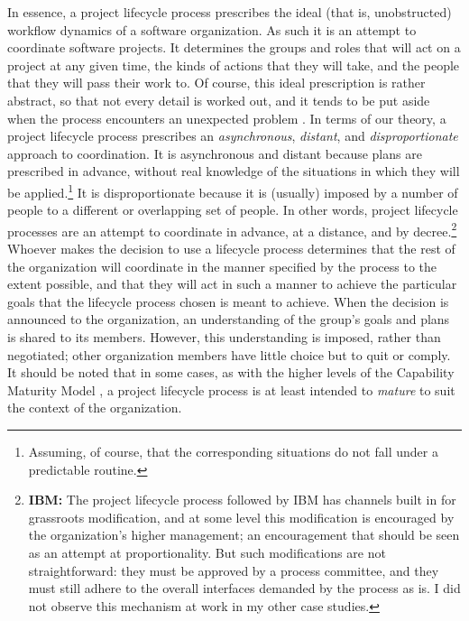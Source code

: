 In essence, a project lifecycle process prescribes the ideal (that is, unobstructed) workflow dynamics of a software organization. As such it is an attempt to coordinate software projects. It determines the groups and roles that will act on a project at any given time, the kinds of actions that they will take, and the people that they will pass their work to. Of course, this ideal prescription is rather abstract, so that not every detail is worked out, and it tends to be put aside when the process encounters an unexpected problem \cite{Suchman1987}. In terms of our theory, a project lifecycle process prescribes an \emph{asynchronous}, \emph{distant}, and \emph{disproportionate} approach to coordination. It is asynchronous and distant because plans are prescribed in advance, without real knowledge of the situations in which they will be applied.\footnote{Assuming, of course, that the corresponding situations do not fall under a predictable routine.} It is disproportionate because it is (usually) imposed by a number of people to a different or overlapping set of people. In other words, project lifecycle processes are an attempt to coordinate in advance, at a distance, and by decree.\footnote{\textbf{IBM:} The project lifecycle process followed by IBM has channels built in for grassroots modification, and at some level this modification is encouraged by the organization's higher management; an encouragement that should be seen as an attempt at proportionality. But such modifications are not straightforward: they must be approved by a process committee, and they must still adhere to the overall interfaces demanded by the process as is. I did not observe this mechanism at work in my other case studies.} Whoever makes the decision to use a lifecycle process determines that the rest of the organization will coordinate in the manner specified by the process to the extent possible, and that they will act in such a manner to achieve the particular goals that the lifecycle process chosen is meant to achieve. When the decision is announced to the organization, an understanding of the group's goals and plans is shared to its members. However, this understanding is imposed, rather than negotiated; other organization members have little choice but to quit or comply. It should be noted that in some cases, as with the higher levels of the Capability Maturity Model \cite{Humphrey1989}, a project lifecycle process is at least intended to \emph{mature} to suit the context of the organization.

